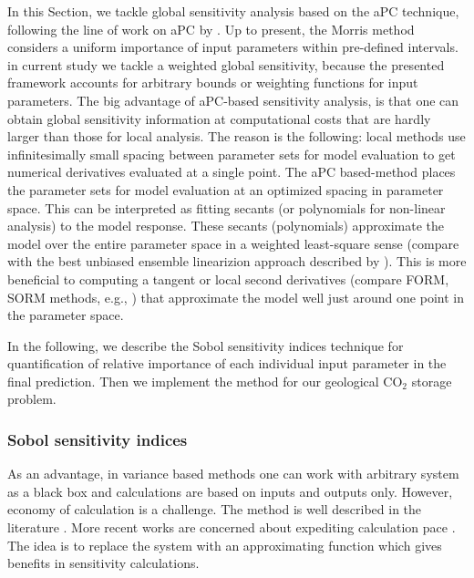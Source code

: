 In this Section, we tackle global sensitivity analysis based on the aPC
technique, following the line of work on aPC by \cite{oladyshkin2011concept,
OladNowakBarros_AWR2011}. Up to present, the Morris method \cite{Morris1991}
considers a uniform importance of input parameters within pre-defined intervals.
in current study we tackle a weighted global sensitivity, because the presented
framework accounts for arbitrary bounds or weighting functions for input
parameters.  The big advantage of aPC-based sensitivity analysis, is that one
can obtain global sensitivity information at computational costs that are hardly
larger than those for local analysis. The reason is the following: local methods
use infinitesimally small spacing between parameter sets for model evaluation to
get numerical derivatives evaluated at a single point. The aPC based-method
places the parameter sets for model evaluation at an optimized spacing in
parameter space. This can be interpreted as fitting secants (or polynomials for
non-linear 
analysis) to the model response. These secants (polynomials) approximate the
model over the entire parameter space in a weighted least-square sense (compare
with the best unbiased ensemble linearizion approach described by
\cite{Nowak_2009_BUEL}). This is more beneficial to computing a tangent or local
second derivatives (compare FORM, SORM methods, e.g., \cite{Jang1994}) that
approximate the model well just around one point in the parameter space.

In the following, we describe the Sobol sensitivity indices technique for
quantification of relative importance of each individual input parameter in the
final prediction. Then we implement the method for our geological
$\mbox{CO}_{2}$ storage problem.


\subsubsection{Sobol sensitivity indices}

As an advantage, in variance based methods one can work with arbitrary system as
a black box and calculations are based on inputs and outputs only. However,
economy of calculation is a challenge. The method is well described in the
literature
\cite{sobol2001global,saltelli2007global,saltelli4global,reuter2008global}. More
recent works are concerned about expediting calculation pace
\cite{crestaux2009polynomial,oladyshkin2011concept, OladNowakBarros_AWR2011}.
The idea is to replace the system with an approximating function which gives
benefits in sensitivity calculations.

